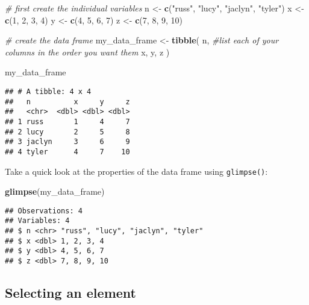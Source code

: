 \documentclass[12pt,]{book}
\newenvironment{Shaded}{\begin{snugshade}}{\end{snugshade}}
\newcommand{\CommentTok}[1]{\textcolor[rgb]{0.56,0.35,0.01}{\textit{#1}}}
\newcommand{\DecValTok}[1]{\textcolor[rgb]{0.00,0.00,0.81}{#1}}
\newcommand{\KeywordTok}[1]{\textcolor[rgb]{0.13,0.29,0.53}{\textbf{#1}}}
\newcommand{\NormalTok}[1]{#1}
\newcommand{\StringTok}[1]{\textcolor[rgb]{0.31,0.60,0.02}{#1}}
\begin{document}
\begin{Shaded}
\begin{Highlighting}[]
\CommentTok{# first create the individual variables}
\NormalTok{n <-}\StringTok{ }\KeywordTok{c}\NormalTok{(}\StringTok{"russ"}\NormalTok{, }\StringTok{"lucy"}\NormalTok{, }\StringTok{"jaclyn"}\NormalTok{, }\StringTok{"tyler"}\NormalTok{)}
\NormalTok{x <-}\StringTok{ }\KeywordTok{c}\NormalTok{(}\DecValTok{1}\NormalTok{, }\DecValTok{2}\NormalTok{, }\DecValTok{3}\NormalTok{, }\DecValTok{4}\NormalTok{)}
\NormalTok{y <-}\StringTok{ }\KeywordTok{c}\NormalTok{(}\DecValTok{4}\NormalTok{, }\DecValTok{5}\NormalTok{, }\DecValTok{6}\NormalTok{, }\DecValTok{7}\NormalTok{)}
\NormalTok{z <-}\StringTok{ }\KeywordTok{c}\NormalTok{(}\DecValTok{7}\NormalTok{, }\DecValTok{8}\NormalTok{, }\DecValTok{9}\NormalTok{, }\DecValTok{10}\NormalTok{)}

\CommentTok{# create the data frame}
\NormalTok{my_data_frame <-}
\StringTok{  }\KeywordTok{tibble}\NormalTok{(}
\NormalTok{    n, }\CommentTok{#list each of your columns in the order you want them}
\NormalTok{    x,}
\NormalTok{    y,}
\NormalTok{    z}
\NormalTok{  )}

\NormalTok{my_data_frame}
\end{Highlighting}
\end{Shaded}

\begin{verbatim}
## # A tibble: 4 x 4
##   n          x     y     z
##   <chr>  <dbl> <dbl> <dbl>
## 1 russ       1     4     7
## 2 lucy       2     5     8
## 3 jaclyn     3     6     9
## 4 tyler      4     7    10
\end{verbatim}

Take a quick look at the properties of the data frame using \texttt{glimpse()}:

\begin{Shaded}
\begin{Highlighting}[]
\KeywordTok{glimpse}\NormalTok{(my_data_frame) }
\end{Highlighting}
\end{Shaded}

\begin{verbatim}
## Observations: 4
## Variables: 4
## $ n <chr> "russ", "lucy", "jaclyn", "tyler"
## $ x <dbl> 1, 2, 3, 4
## $ y <dbl> 4, 5, 6, 7
## $ z <dbl> 7, 8, 9, 10
\end{verbatim}

\hypertarget{selecting-an-element}{%
\subsection{Selecting an element}\label{selecting-an-element}}
\end{document}
